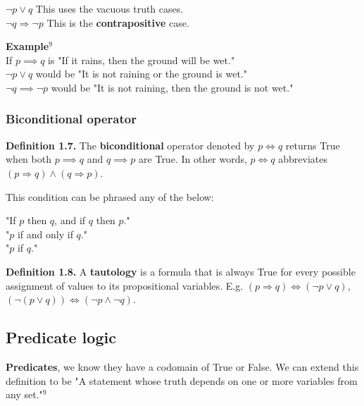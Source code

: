 \documentclass{article}
\begin{document}
$\neg p \lor q$ \hfill This uses the vacuous truth cases. \\
$\neg q \Rightarrow \neg p$ \hfill This is the \textbf{contrapositive} case.

\textbf{Example$^{9}$} \\
If $p \implies q$ is \hfill "If it rains, then the ground will be wet." \\
$\neg p \lor q$ would be \hfill "It is not raining or the ground is wet." \\
$\neg q \implies \neg p$ would be \hfill "It is not raining, then the ground is not wet."



\subsubsection*{Biconditional operator}
\textbf{Definition 1.7.} The \textbf{biconditional} operator denoted by $p \iff q$ 
returns True when both $p \implies q$ and $q \implies p$ are True. In other words,
$p \iff q$ abbreviates $(p \Rightarrow q) \land (q \Rightarrow p)$.

This condition can be phrased any of the below: 
\begin{center}
"If $p$ then $q$, and if $q$ then $p$." \\
"$p$ if and only if $q$." \\
"$p$ if $q$."
\end{center}

\textbf{Definition 1.8.} A \textbf{tautology} is a formula that is always
True for every possible assignment of values to its propositional variables. E.g. 
$(p \Rightarrow q) \Leftrightarrow (\neg p \lor q)$, $(\neg(p\lor q)) 
\Leftrightarrow (\neg p \land \neg q)$.



\subsection{Predicate logic}
\textbf{Predicates}, we know they have a codomain of True or False. 
We can extend this definition to be "A statement whose truth depends on one or
more variables from any set."$^9$
\end{document}

